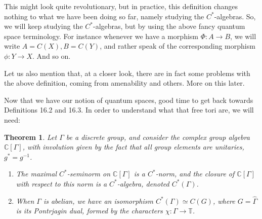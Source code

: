 \documentclass[12pt]{amsbook}
\newtheorem{theorem}{Theorem}[chapter]
\begin{document}
This might look quite revolutionary, but in practice, this definition changes nothing to what we have been doing so far, namely studying the $C^*$-algebras. So, we will keep studying the $C^*$-algebras, but by using the above fancy quantum space terminology. For instance whenever we have a morphism $\Phi:A\to B$, we will write $A=C(X),B=C(Y)$, and rather speak of the corresponding morphism $\phi:Y\to X$. And so on.

\bigskip

Let us also mention that, at a closer look, there are in fact some problems with the above definition, coming from amenability and others. More on this later.

\bigskip

Now that we have our notion of quantum spaces, good time to get back towards Definitions 16.2 and 16.3. In order to understand what that free tori are, we will need:

\begin{theorem}
Let $\Gamma$ be a discrete group, and consider the complex group algebra $\mathbb C[\Gamma]$, with involution given by the fact that all group elements are unitaries, $g^*=g^{-1}$.
\begin{enumerate}
\item The maximal $C^*$-seminorm on $\mathbb C[\Gamma]$ is a $C^*$-norm, and the closure of $\mathbb C[\Gamma]$ with respect to this norm is a $C^*$-algebra, denoted $C^*(\Gamma)$.

\item When $\Gamma$ is abelian, we have an isomorphism $C^*(\Gamma)\simeq C(G)$, where $G=\widehat{\Gamma}$ is its Pontrjagin dual, formed by the characters $\chi:\Gamma\to\mathbb T$.
\end{enumerate}
\end{theorem}
\end{document}
